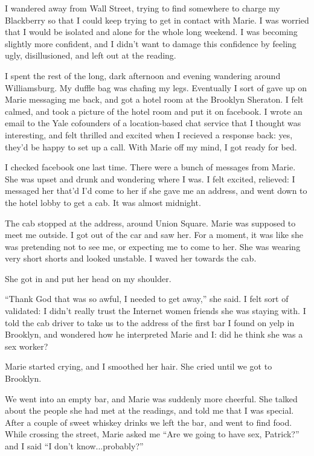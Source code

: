 \documentclass[12pt]{article}
\begin{document}
I wandered away from Wall Street, trying to find somewhere to charge my
Blackberry  so that I could keep trying to get in contact with Marie. I was
worried that I would be isolated and alone for the whole long weekend.  I was
becoming slightly more confident, and I didn't want to damage this confidence by
feeling ugly, disillusioned, and left out at the reading.

I spent the rest of the long, dark afternoon and evening wandering around
Williamsburg.  My duffle bag was chafing my legs.  Eventually I sort of gave up
on Marie messaging me back, and got a hotel room at the Brooklyn Sheraton.  I
felt calmed, and took a picture of the hotel room and put it on facebook.  I
wrote an email to the Yale cofounders of a location-based chat service that I
thought was interesting, and felt thrilled and excited when I recieved a
response back: yes, they'd be happy to set up a call.  With Marie off my mind, I
got ready for bed.  

I checked facebook one last time.  There were a bunch of messages from Marie.
She was upset and drunk and wondering where I was.  I felt excited, relieved: I
messaged her that'd I'd come to her if she gave me an address, and went down to
the hotel lobby to get a cab.  It was almost midnight.

The cab stopped at the address, around Union Square.  Marie was supposed to meet
me outside.  I got out of the car and saw her.  For a moment, it was like she
was pretending not to see me, or expecting me to come to her.  She was wearing
very short shorts and looked unstable.  I waved her towards the cab.  

She got in and put her head on my shoulder.

``Thank God that was so awful, I needed to get away,'' she said.  I felt sort of
validated: I didn't really trust the Internet women friends she was staying
with.  I told the cab driver to take us to the address of the first bar I found
on yelp in Brooklyn, and wondered how he interpreted Marie and I: did he think
she was a sex worker?  

Marie started crying, and I smoothed her hair.  She cried until we got to
Brooklyn.

We went into an empty bar, and Marie was suddenly more cheerful.  She talked
about the people she had met at the readings, and told me that I was special.
After a couple of sweet whiskey drinks we left the bar, and went to find 
food.  While crossing the street, Marie asked me ``Are we going to have sex,
Patrick?'' and I said ``I don't know...probably?''
\end{document}
